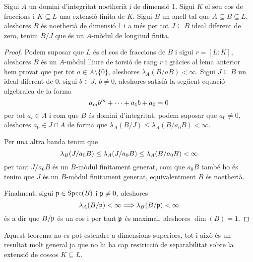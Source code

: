\documentclass[../../../main.tex]{subfiles}
\begin{document}
\begin{ter}
\label{ter:krullAkizuki} Sigui $A$ un domini d'integritat noetherià i de dimensió 1. Sigui $K$ el seu cos de fraccions i $K\subseteq L$ una extensió finita de $K$. Sigui $B$ un anell tal que $A\subseteq B\subseteq L$, aleshores $B$ és noetherià de dimensió 1 i a més per tot $J\subseteq B$ ideal diferent de zero, tenim $B/J$ que és un $A$-mòdul de longitud finita.
\end{ter}
\begin{proof}
Podem suposar que $L$ és el cos de fraccions de $B$ i sigui $r = [L:K]$, aleshores $B$ és un $A$-mòdul lliure de torsió de rang $r$ i gràcies al lema anterior hem provat que per tot $a\in A\setminus\{0\}$, aleshores $\lambda_A(B/aB)<\infty$. Sigui $J\subseteq B$ un ideal diferent de 0, sigui $b\in J$, $b\neq 0$, aleshores satisfà la següent equació algebraica de la forma
\begin{equation}
    \notag
    a_mb^m+\cdots+a_1b+a_0 = 0
\end{equation}
per tot $a_i\in A$ i com que $B$ és domini d'integritat, podem suposar que $a_0\neq0$, aleshores $a_0\in J\cap A$ de forma que $\lambda_A(B/J)\leq \lambda_A(B/a_0B)<\infty$.

Per una altra banda tenim que
\begin{equation}
    \notag
    \lambda_B(J/a_0B)\leq \lambda_A(J/a_0B)\leq \lambda_A(B/a_0B)<\infty
\end{equation}
per tant $J/a_0B$ és un $B$-mòdul finitament generat, com que $a_0B$ també ho és tenim que $J$ és un $B$-mòdul finitament generat, equivalentment $B$ és noetherià.

Finalment, sigui $\mathfrak{p}\in \mathrm{Spec}(B)$ i $\mathfrak{p}\neq 0$, aleshores
\begin{equation}
    \notag
    \lambda_A(B/\mathfrak{p})<\infty\Longrightarrow \lambda_B(B/\mathfrak{p})<\infty
\end{equation}
és a dir que $B/\mathfrak{p}$ és un cos i per tant $\mathfrak{p}$ és maximal, aleshores $\dim(B) = 1$.
\end{proof}



\begin{nota}
Aquest teorema no es pot estendre a dimensions superiors, tot i això és un resultat molt general ja que no hi ha cap restricció de separabilitat sobre la extensió de cossos $K\subseteq L$.
\end{nota}
\end{document}
